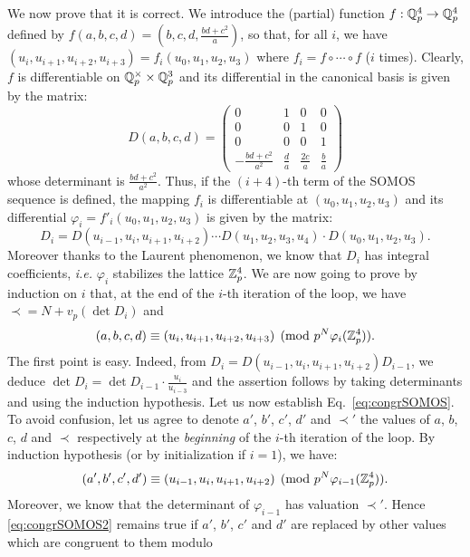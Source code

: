 \documentclass{lms}
\begin{document}
We now prove that it is correct.
We introduce the (partial) function $f : \mathbb Q_p^4 \to \mathbb Q_p^4$ defined by 
$f(a,b,c,d) = (b,c,d,\frac{bd+c^2}a)$, so that, for all $i$, we have 
$(u_i, u_{i+1}, u_{i+2}, u_{i+3}) = f_i(u_0, u_1, u_2, u_3)$ where $f_i
= f \circ \cdots \circ f$ ($i$ times). Clearly, $f$ is  
differentiable on $\mathbb Q_p^\times \times \mathbb Q_p^3$ and its differential in the 
canonical basis is given by the matrix:
$$D(a,b,c,d) = \begin{pmatrix}
0 & 1 & 0 & 0 \\
0 & 0 & 1 & 0 \\
0 & 0 & 0 & 1 \\
-\frac{bd+c^2}{a^2} & \frac d a & \frac {2c} a & \frac b a
\end{pmatrix}$$
whose determinant is $\frac{bd+c^2}{a^2}$. Thus, if the $(i+4)$-th term 
of the SOMOS sequence is defined, the mapping $f_i$ is differentiable
at $(u_0, u_1, u_2, u_3)$ and its differential $\varphi_i = 
f'_i(u_0, u_1, u_2, u_3)$ is given by the matrix:
$$D_i = D(u_{i-1}, u_i, u_{i+1}, u_{i+2}) \cdots
D(u_1, u_2, u_3, u_4) \cdot D(u_0, u_1, u_2, u_3).$$
Moreover thanks to the Laurent phenomenon, we know that $D_i$ has
integral coefficients, \emph{i.e.} $\varphi_i$ stabilizes the lattice
$\mathbb Z_p^4$.
We are now going to prove by induction on $i$ that, at the end of the 
$i$-th iteration of the loop, we have $\prec = N + v_p(\det D_i)$ and
\begin{equation}
\label{eq:congrSOMOS}
(a, b, c, d) \equiv (u_i, u_{i+1}, u_{i+2}, u_{i+3}) \pmod
{p^N \varphi_i(\mathbb Z_p^4)}.
\end{equation}
The first point is easy. Indeed, from $D_i = D(u_{i-1}, u_i, u_{i+1}, 
u_{i+2}) D_{i-1}$, we deduce $\det D_i = \det D_{i-1} \cdot 
\frac{u_i}{u_{i-3}}$ and the assertion follows by taking determinants
and using the induction hypothesis. 
Let us now establish Eq.~\eqref{eq:congrSOMOS}. To avoid confusion, 
let us agree to denote $a'$, $b'$, $c'$, $d'$ and $\prec'$ the values of 
$a$, $b$, $c$, $d$ and $\prec$ respectively at the \emph{beginning} of 
the $i$-th iteration of the loop. By induction hypothesis (or by 
initialization if $i = 1$), we have:
\begin{equation}
\label{eq:congrSOMOS2}
(a', b', c', d') \equiv (u_{i-1}, u_i, u_{i+1}, u_{i+2}) \pmod
{p^N \varphi_{i-1}(\mathbb Z_p^4)}.
\end{equation}
Moreover, we know that the determinant of $\varphi_{i-1}$ has valuation
$\prec'$. Hence \eqref{eq:congrSOMOS2} remains true if $a'$, $b'$, $c'$
and $d'$ are replaced by other values which are congruent to them modulo
\end{document}

